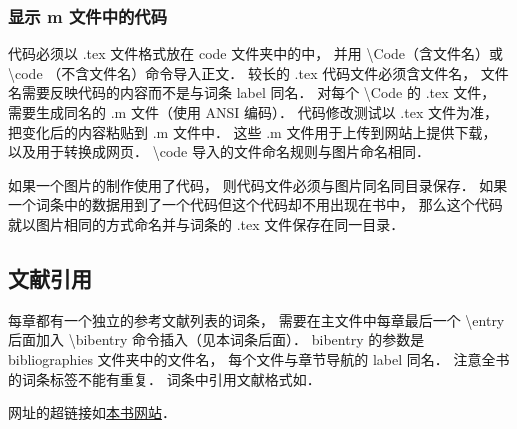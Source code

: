 \subsubsection{显示 m 文件中的代码}

代码必须以  .tex 文件格式放在 code 文件夹中的中， 并用 \textbackslash Code（含文件名）或  \textbackslash code （不含文件名）命令导入正文． 较长的 .tex 代码文件必须含文件名， 文件名需要反映代码的内容而不是与词条 label 同名． 对每个 \textbackslash Code 的 .tex 文件， 需要生成同名的 .m 文件（使用 ANSI 编码）． 代码修改测试以 .tex 文件为准， 把变化后的内容粘贴到 .m 文件中． 这些 .m 文件用于上传到网站上提供下载， 以及用于转换成网页． \textbackslash code 导入的文件命名规则与图片命名相同．

如果一个图片的制作使用了代码， 则代码文件必须与图片同名同目录保存． 如果一个词条中的数据用到了一个代码但这个代码却不用出现在书中， 那么这个代码就以图片相同的方式命名并与词条的 .tex 文件保存在同一目录． 


\subsection{文献引用}
每章都有一个独立的参考文献列表的词条， 需要在主文件中每章最后一个 \textbackslash entry 后面加入 \textbackslash bibentry 命令插入（见本词条后面）． bibentry 的参数是 bibliographies 文件夹中的文件名， 每个文件与章节导航的 label 同名． 注意全书的词条标签不能有重复． 词条中引用文献格式如\cite{PhysWiki}\cite{PhysWikiEng}．

网址的超链接如\href{http://littleshi.cn}{\color{blue}本书网站}．

